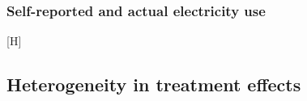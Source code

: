 \documentclass[
  letterpaper,
  DIV=11,
  numbers=noendperiod]{scrartcl}
\makeatletter
\renewenvironment{figure}%
   {\renewcommand\familydefault\sfdefault
    \@float{figure}}
   {\end@float}
\makeatother
\begin{document}
\newpage

\subsubsection{Self-reported and actual electricity
use}\label{self-reported-and-actual-electricity-use}

\begin{figure}[H]

\caption{\label{fig-afig-elec}Comparison of self-reported winter
electricity bills and actual electricity bills (n=37 households).
Scatterpoint color indicates treatment status and diameter represents
the ratio between the actual and self-reported winter electricity bills.
The 45-degree dotted line indicates where the self-report is equal to
the actual electricity bill.}


\end{figure}%

\newpage

\subsection{Heterogeneity in treatment
effects}\label{heterogeneity-in-treatment-effects}
\end{document}
